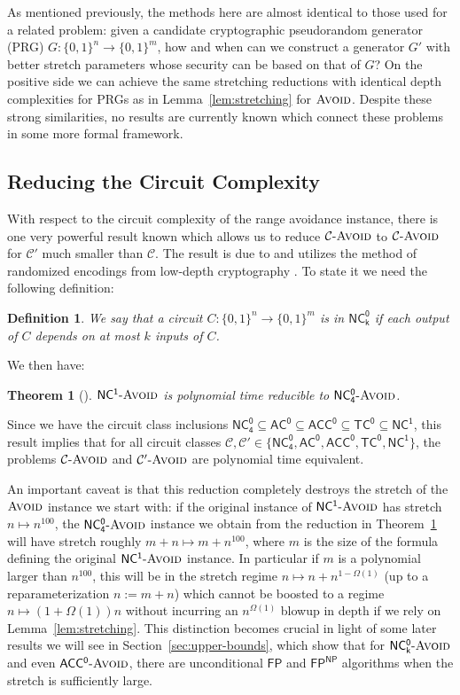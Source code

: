 \documentclass[11pt]{article}
\newtheorem{theorem}{Theorem}
\newtheorem{definition}{Definition}
\newcommand{\dash}{\text{-}}
\newcommand{\B}{\{0,1\}}
\newcommand{\avoid}{\textsc{Avoid}}
\begin{document}
As mentioned previously, the methods here are almost identical to those used for a related problem: given a candidate cryptographic pseudorandom generator (PRG) $G: \B^n \to \B^m$, how and when can we construct a generator $G'$ with better stretch parameters whose security can be based on that of $G$? On the positive side we can achieve the same stretching reductions with identical depth complexities for PRGs as in Lemma~\ref{lem:stretching} for $\avoid$. Despite these strong similarities, no results are currently known which connect these problems in some more formal framework. 
\subsection{Reducing the Circuit Complexity}\label{sec:depth-reduction}
With respect to the circuit complexity of the range avoidance instance, there is one very powerful result known which allows us to reduce $\mathcal{C}\dash \avoid$ to $\mathcal{C}\dash\avoid$ for $\mathcal{C'}$ much smaller than $\mathcal{C}$. The result is due to \cite{RSW} and utilizes the method of randomized encodings from low-depth cryptography \cite{nc-crypto}. To state it we need the following definition:
\begin{definition}
We say that a circuit $C:\B^n \to \B^m$ is in $\mathsf{NC^0_k}$ if each output of $C$ depends on at most $k$ inputs of $C$.
\end{definition}
We then have:
\begin{theorem}[\cite{RSW}]\label{thm:depth-reduction}
$\mathsf{NC^1}\dash \avoid$ is polynomial time reducible to $\mathsf{NC^0_4}\dash \avoid$.
\end{theorem}

Since we have the circuit class inclusions $\mathsf{NC^0_{4}} \subseteq \mathsf{AC^0} \subseteq \mathsf{ACC^0} \subseteq \mathsf{TC^0} \subseteq \mathsf{NC^1}$, this result implies that for all circuit classes $\mathcal{C}, \mathcal{C}' \in \{\mathsf{NC^0_{4}}, \mathsf{AC^0}, \mathsf{ACC^0}, \mathsf{TC^0}, \mathsf{NC^1} \}$, the problems $\mathcal{C}\dash\avoid$ and $\mathcal{C}'\dash\avoid$ are polynomial time equivalent. 

An important caveat is that this reduction completely destroys the stretch of the $\avoid$ instance we start with: if the original instance of $\mathsf{NC^1}\dash\avoid$ has stretch $n \mapsto n^{100}$, the $\mathsf{NC^0_4}\dash\avoid$ instance we obtain from the reduction in Theorem~\ref{thm:depth-reduction} will have stretch roughly $m + n \mapsto m + n^{100}$, where $m$ is the size of the formula defining the original $\mathsf{NC^1}\dash\avoid$ instance. In particular if $m$ is a polynomial larger than $n^{100}$, this will be in the stretch regime $n \mapsto n + n^{1 - \Omega(1)}$ (up to a reparameterization $n:= m + n$) which cannot be boosted to a regime $n \mapsto (1+\Omega(1))n$ without incurring an $n^{\Omega(1)}$ blowup in depth if we rely on Lemma~\ref{lem:stretching}. This distinction becomes crucial in light of some later results we will see in Section~\ref{sec:upper-bounds}, which show that for $\mathsf{NC^0_k}\dash\avoid$ and even $\mathsf{ACC^0}\dash\avoid$, there are unconditional $\mathsf{FP}$ and $\mathsf{FP^{NP}}$ algorithms when the stretch is sufficiently large.
\end{document}
